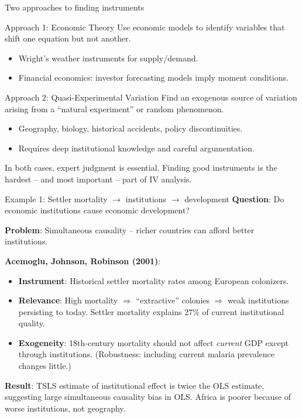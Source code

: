 \documentclass[10pt]{beamer}
\begin{document}
\begin{frame}{Two approaches to finding instruments}
\label{slide:finding_instruments}
\begin{block}{Approach 1: Economic Theory}
Use economic models to identify variables that shift one equation but not another.
\begin{itemize}
  \item Wright's weather instruments for supply/demand.
  \item Financial economics: investor forecasting models imply moment conditions.
\end{itemize}
\end{block}

\pause
\begin{block}{Approach 2: Quasi-Experimental Variation}
Find an exogenous source of variation arising from a ``natural experiment'' or random phenomenon.
\begin{itemize}
  \item Geography, biology, historical accidents, policy discontinuities.
  \item Requires deep institutional knowledge and careful argumentation.
\end{itemize}
\end{block}

\pause
\vspace{0.3em}
In both cases, \alert{expert judgment is essential}. Finding good instruments is the hardest -- and most important -- part of IV analysis.
\end{frame}

\begin{frame}{Example 1: Settler mortality $\to$ institutions $\to$ development}
\label{slide:ajr}
\textbf{Question}: Do economic institutions cause economic development?

\textbf{Problem}: Simultaneous causality -- richer countries can afford better institutions.

\pause
\vspace{0.3em}
\textbf{Acemoglu, Johnson, Robinson (2001)}:
\begin{itemize}
  \item \textbf{Instrument}: Historical settler mortality rates among European colonizers.
  \item \textbf{Relevance}: High mortality $\Rightarrow$ ``extractive'' colonies $\Rightarrow$ weak institutions persisting to today. Settler mortality explains 27\% of current institutional quality.
  \item \textbf{Exogeneity}: 18th-century mortality should not affect \emph{current} GDP except through institutions. (Robustness: including current malaria prevalence changes little.)
\end{itemize}

\pause
\vspace{0.3em}
\textbf{Result}: TSLS estimate of institutional effect is \alert{twice the OLS estimate}, suggesting large simultaneous causality bias in OLS. Africa is poorer because of worse institutions, not geography.
\end{frame}
\end{document}
